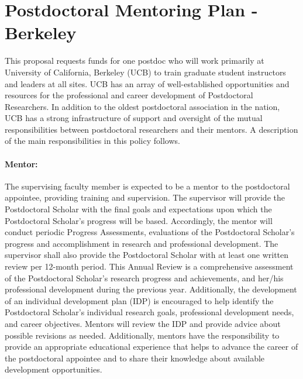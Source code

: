 \documentclass{proposalnsf}
\newlength{\up}
\begin{document}
\newpage
{}
\renewcommand{\thepage} {\footnotesize Postdoctoral Mentoring\,---\,\arabic{page}}


\section*{Postdoctoral Mentoring Plan - Berkeley}

This proposal requests funds for one postdoc who will work primarily at University of California, Berkeley (UCB) to train graduate student instructors and
leaders at all sites. UCB has an array of
well-established opportunities and resources for the professional and career
development of Postdoctoral Researchers. In addition to the oldest postdoctoral
association in the nation, UCB has a strong
infrastructure of support and oversight of the mutual responsibilities between
postdoctoral researchers and their mentors. A description of the main
responsibilities in this policy follows.

\paragraph{Mentor:} The supervising faculty member is expected to be a mentor to the
postdoctoral appointee, providing training and supervision. The supervisor will
provide the Postdoctoral Scholar with the final goals and expectations upon
which the Postdoctoral Scholar’s progress will be based. Accordingly, the
mentor will conduct periodic Progress Assessments, evaluations of the
Postdoctoral Scholar’s progress and accomplishment in research and professional
development.  The supervisor shall also provide the Postdoctoral Scholar with
at least one written review per 12-month period. This Annual Review is a
comprehensive assessment of the Postdoctoral Scholar’s research progress and
achievements, and her/his professional development during the previous year.
Additionally, the development of an individual development plan (IDP) is
encouraged to help identify the Postdoctoral Scholar’s individual research
goals, professional development needs, and career objectives. Mentors will
review the IDP and provide advice about possible revisions as needed.
Additionally, mentors have the responsibility to provide an appropriate
educational experience that helps to advance the career of the postdoctoral
appointee and to share their knowledge about available development
opportunities. 
\end{document}
